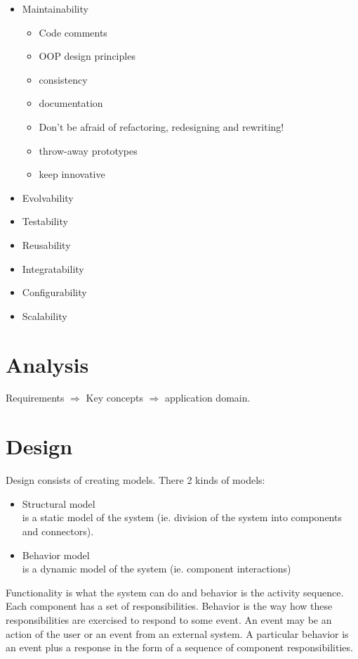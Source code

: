 \documentclass[a4paper]{report}
\begin{document}
\begin{itemize}
  \item Maintainability
    \begin{itemize}
      \item Code comments
      \item OOP design principles
      \item consistency
      \item documentation
      \item Don't be afraid of refactoring, redesigning and rewriting!
      \item throw-away prototypes
      \item keep innovative
    \end{itemize}
  \item Evolvability
  \item Testability
  \item Reusability
  \item Integratability
  \item Configurability
  \item Scalability
\end{itemize}

\section{Analysis}

Requirements $\Rightarrow$ Key concepts $\Rightarrow$ application domain.

\section{Design}

Design consists of creating models. There 2 kinds of models:

\begin{itemize}
  \item Structural model \\
        is a static model of the system (ie. division of the system into
        components and connectors).
  \item Behavior model \\
        is a dynamic model of the system (ie. component interactions)
\end{itemize}

Functionality is what the system can do and behavior is the activity
sequence. Each component has a set of responsibilities.
Behavior is the way how these responsibilities are exercised to respond to
some event. An event may be an action of the user or an event from an
external system. A particular behavior is an event plus a response in the
form of a sequence of component responsibilities.
\end{document}
